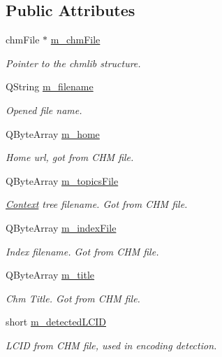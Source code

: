 \subsection*{Public Attributes}
\begin{DoxyCompactItemize}
\item 
chm\+File $\ast$ \hyperlink{classLCHMFileImpl_a82d1d6a252134efcf90a82bf8ffd8493}{m\+\_\+chm\+File}
\begin{DoxyCompactList}\small\item\em Pointer to the chmlib structure. \end{DoxyCompactList}\item 
Q\+String \hyperlink{classLCHMFileImpl_a7e8bf327eeb1f4a3ccebb46ae6bd1bfa}{m\+\_\+filename}
\begin{DoxyCompactList}\small\item\em Opened file name. \end{DoxyCompactList}\item 
Q\+Byte\+Array \hyperlink{classLCHMFileImpl_a5bf6157ef7d4bc446c389eea871c09a0}{m\+\_\+home}
\begin{DoxyCompactList}\small\item\em Home url, got from C\+H\+M file. \end{DoxyCompactList}\item 
Q\+Byte\+Array \hyperlink{classLCHMFileImpl_af3d33a88f44e3d103f08d9cc1c0ccf12}{m\+\_\+topics\+File}
\begin{DoxyCompactList}\small\item\em \hyperlink{classContext}{Context} tree filename. Got from C\+H\+M file. \end{DoxyCompactList}\item 
Q\+Byte\+Array \hyperlink{classLCHMFileImpl_ab5f59c7a474b444bb07a1992bd0a6d82}{m\+\_\+index\+File}
\begin{DoxyCompactList}\small\item\em Index filename. Got from C\+H\+M file. \end{DoxyCompactList}\item 
Q\+Byte\+Array \hyperlink{classLCHMFileImpl_abe88f8991855d7d573bd2966f9fd9f8b}{m\+\_\+title}
\begin{DoxyCompactList}\small\item\em Chm Title. Got from C\+H\+M file. \end{DoxyCompactList}\item 
short \hyperlink{classLCHMFileImpl_a6d5c5705a3c148206aae29da01555ad1}{m\+\_\+detected\+L\+C\+I\+D}
\begin{DoxyCompactList}\small\item\em L\+C\+I\+D from C\+H\+M file, used in encoding detection. \end{DoxyCompactList}\item 

\end{DoxyCompactItemize}
